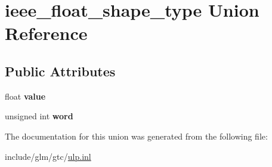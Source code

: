 \hypertarget{unionieee__float__shape__type}{}\section{ieee\+\_\+float\+\_\+shape\+\_\+type Union Reference}
\label{unionieee__float__shape__type}
\subsection*{Public Attributes}
\begin{DoxyCompactItemize}
\item 
\mbox{\label{unionieee__float__shape__type_aa0c47451f1b974421cbb9e2833ddb68e}} 
float {\bfseries value}
\item 
\mbox{\label{unionieee__float__shape__type_a49230c21acd672d044f38b1abcbd6071}} 
unsigned int {\bfseries word}
\end{DoxyCompactItemize}


The documentation for this union was generated from the following file\+:\begin{DoxyCompactItemize}
\item 
include/glm/gtc/\hyperlink{ulp_8inl}{ulp.\+inl}\end{DoxyCompactItemize}
